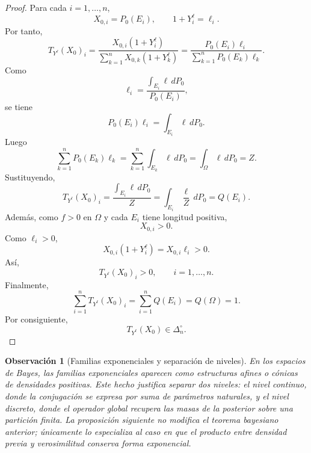 ﻿\documentclass[12pt]{article}
\newtheorem{observacion}{Observación}[section]
\begin{document}
\begin{proof}
Para cada $i=1,\dots,n$,
\[
X_{0,i}=P_0(E_i),
\qquad
1+Y_i^\ell=\ell_i.
\]
Por tanto,
\[
T_{Y^\ell}(X_0)_i
=
\frac{X_{0,i}(1+Y_i^\ell)}{\displaystyle\sum_{k=1}^nX_{0,k}(1+Y_k^\ell)}
=
\frac{P_0(E_i)\ell_i}{\displaystyle\sum_{k=1}^nP_0(E_k)\ell_k}.
\]
Como
\[
\ell_i
=
\frac{\displaystyle\int_{E_i}\ell\,dP_0}{P_0(E_i)},
\]
se tiene
\[
P_0(E_i)\ell_i
=
\int_{E_i}\ell\,dP_0.
\]
Luego
\[
\sum_{k=1}^nP_0(E_k)\ell_k
=
\sum_{k=1}^n\int_{E_k}\ell\,dP_0
=
\int_\Omega\ell\,dP_0
=Z.
\]
Sustituyendo,
\[
T_{Y^\ell}(X_0)_i
=
\frac{\displaystyle\int_{E_i}\ell\,dP_0}{Z}
=
\int_{E_i}\frac{\ell}{Z}\,dP_0
=Q(E_i).
\]
Además, como $f>0$ en $\Omega$ y cada $E_i$ tiene longitud positiva,
\[
X_{0,i}>0.
\]
Como $\ell_i>0$,
\[
X_{0,i}(1+Y_i^\ell)=X_{0,i}\ell_i>0.
\]
Así,
\[
T_{Y^\ell}(X_0)_i>0,
\qquad i=1,\dots,n.
\]
Finalmente,
\[
\sum_{i=1}^nT_{Y^\ell}(X_0)_i
=
\sum_{i=1}^nQ(E_i)
=
Q(\Omega)
=1.
\]
Por consiguiente,
\[
T_{Y^\ell}(X_0)\in\Delta_n^\circ.
\]
\end{proof}

\begin{observacion}[Familias exponenciales y separación de niveles]
En los espacios de Bayes, las familias exponenciales aparecen como estructuras afines o cónicas de densidades positivas. Este hecho justifica separar dos niveles: el nivel continuo, donde la conjugación se expresa por suma de parámetros naturales, y el nivel discreto, donde el operador global recupera las masas de la posterior sobre una partición finita. La proposición siguiente no modifica el teorema bayesiano anterior; únicamente lo especializa al caso en que el producto entre densidad previa y verosimilitud conserva forma exponencial.
\end{observacion}
\end{document}

